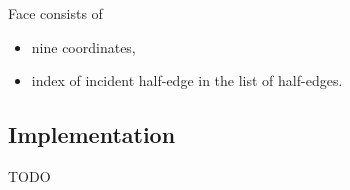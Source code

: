 Face consists of
\begin{itemize}
    \setlength\itemsep{-2mm}
    \item nine coordinates,
    \item index of incident half-edge in the list of half-edges.
\end{itemize}

\subsection*{Implementation}
TODO
